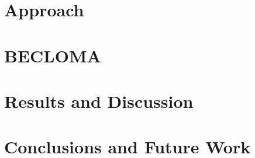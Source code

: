 \documentclass{seal_thesis}
\newcommand\toolname[0]{BECLOMA}
\begin{document}
\chapter{Approach}
\label{sec:approach}


\chapter{\toolname}


\chapter{Results and Discussion}


\chapter{Conclusions and Future Work}





\backmatter


\end{document}
